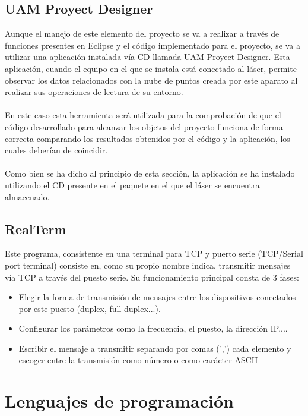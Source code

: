 \subsection{ UAM Proyect Designer}
Aunque el manejo de este elemento del proyecto se va a realizar a través de funciones presentes en Eclipse y el código implementado para el proyecto, se va a utilizar una aplicación instalada vía CD llamada UAM Proyect Designer. Esta aplicación, cuando el equipo en el que se instala está conectado al láser, permite observar los datos relacionados con la nube de puntos creada por este aparato al realizar sus operaciones de lectura de su entorno.\\
\\
En este caso esta herramienta será utilizada para la comprobación de que el código desarrollado para alcanzar los objetos del proyecto funciona de forma correcta comparando los resultados obtenidos por el código y la aplicación, los cuales deberían de coincidir.\\
\\
Como bien se ha dicho al principio de esta sección, la aplicación se ha instalado utilizando el CD presente en el paquete en el que el láser se encuentra almacenado. 

\subsection{RealTerm}

Este programa, consistente en una terminal para TCP y puerto serie (TCP/Serial port terminal) consiste en, como su propio nombre indica, transmitir mensajes vía TCP a través del puesto serie. Su funcionamiento principal consta de 3 fases:
\begin{itemize}
	\item Elegir la forma de transmisión de mensajes entre los dispositivos conectados por este puesto (duplex, full duplex...).
	\item Configurar los parámetros como la frecuencia, el puesto, la dirección IP....
	\item Escribir el mensaje a transmitir separando por comas (',') cada elemento y escoger entre la transmisión como número o como carácter ASCII
\end{itemize}

\section{Lenguajes de programación}

